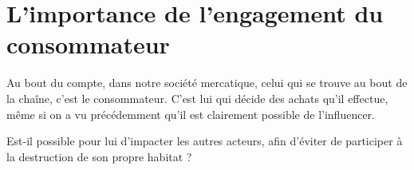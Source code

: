 \section{L'importance de l'engagement du consommateur}

\smallbreak Au bout du compte, dans notre société mercatique, celui qui se trouve au bout de la chaîne, c'est le consommateur.
C'est lui qui décide des achats qu'il effectue, même si on a vu précédemment qu'il est clairement possible de l'influencer.

Est-il possible pour lui d'impacter les autres acteurs, afin d'éviter de participer à la destruction de son propre habitat ?
